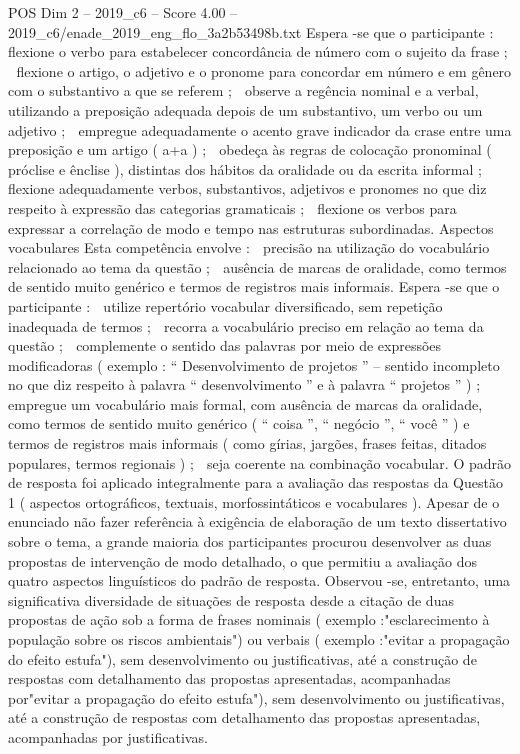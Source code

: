 \begin{textsample}{POS Dim 2 – 2019\_c6 – Score 4.00 – 2019\_c6/enade\_2019\_eng\_flo\_3a2b53498b.txt}
Espera -se que o participante :  flexione o verbo para estabelecer concordância de número com o sujeito da frase ;  flexione o artigo, o adjetivo e o pronome para concordar em número e em gênero com o substantivo a que se referem ;  observe a regência nominal e a verbal, utilizando a preposição adequada depois de um substantivo, um verbo ou um adjetivo ;  empregue adequadamente o acento grave indicador da crase entre uma preposição e um artigo ( a+a ) ;  obedeça às regras de colocação pronominal ( próclise e ênclise ), distintas dos hábitos da oralidade ou da escrita informal ;  flexione adequadamente verbos, substantivos, adjetivos e pronomes no que diz respeito à expressão das categorias gramaticais ;  flexione os verbos para expressar a correlação de modo e tempo nas estruturas subordinadas.
Aspectos vocabulares Esta competência envolve :  precisão na utilização do vocabulário relacionado ao tema da questão ;  ausência de marcas de oralidade, como termos de sentido muito genérico e termos de registros mais informais.
Espera -se que o participante :  utilize repertório vocabular diversificado, sem repetição inadequada de termos ;  recorra a vocabulário preciso em relação ao tema da questão ;  complemente o sentido das palavras por meio de expressões modificadoras ( exemplo : “ Desenvolvimento de projetos ” – sentido incompleto no que diz respeito à palavra “ desenvolvimento ” e à palavra “ projetos ” ) ;  empregue um vocabulário mais formal, com ausência de marcas da oralidade, como termos de sentido muito genérico ( “ coisa ”, “ negócio ”, “ você ” ) e termos de registros mais informais ( como gírias, jargões, frases feitas, ditados populares, termos regionais ) ;  seja coerente na combinação vocabular.
O padrão de resposta foi aplicado integralmente para a avaliação das respostas da Questão 1 ( aspectos ortográficos, textuais, morfossintáticos e vocabulares ).
Apesar de o enunciado não fazer referência à exigência de elaboração de um texto dissertativo sobre o tema, a grande maioria dos participantes procurou desenvolver as duas propostas de intervenção de modo detalhado, o que permitiu a avaliação dos quatro aspectos linguísticos do padrão de resposta.
Observou -se, entretanto, uma significativa diversidade de situações de resposta desde a citação de duas propostas de ação sob a forma de frases nominais ( exemplo :"esclarecimento à população sobre os riscos ambientais") ou verbais ( exemplo :"evitar a propagação do efeito estufa"), sem desenvolvimento ou justificativas, até a construção de respostas com detalhamento das propostas apresentadas, acompanhadas por"evitar a propagação do efeito estufa"), sem desenvolvimento ou justificativas, até a construção de respostas com detalhamento das propostas apresentadas, acompanhadas por justificativas.

\end{textsample}
